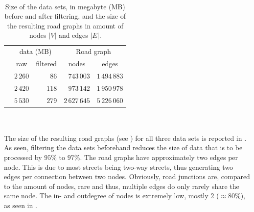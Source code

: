	\begin{table}[ht]
	 	\begin{center}
	 		\phantom{v}\quad\\
			\begin{tabular}{|l||r|r|r|r|}
				\hline
							&\multicolumn{2}{c|}{data (MB)}	&\multicolumn{2}{c|}{Road graph}\\
							&\multicolumn{1}{c|}{raw}	&\multicolumn{1}{c|}{filtered}	&\multicolumn{1}{c|}{nodes}
								&\multicolumn{1}{c|}{edges}\\\hline
				\freiburgR		&$2\,260$	&$86$		&$743\,003$		&$1\,494\,883$\\
				\stuttgartR		&$2\,420$	&$118$	&$973\,142$		&$1\,950\,978$\\
				\switzerlandR	&$5\,530$	&$279$	&$2\,627\,645$	&$5\,226\,060$\\\hline
			\end{tabular}
		\end{center}
		\caption{Size of the \osm data sets, in megabyte (MB) before and after filtering, and the size of the resulting road graphs
			in amount of nodes $|V|$ and edges $|E|$.}
		\label{osmSize}
	\end{table}\quad\\\\
	The size of the resulting road graphs (see ) for all three data sets is reported in .
	As seen, filtering the \osm data sets beforehand reduces the size of data that is to be processed by $95\%$ to $97\%$.
	The road graphs have approximately two edges per node. This is due to most streets being two-way streets, thus generating
	two edges per connection between two nodes. Obviously, road junctions are, compared to the amount of nodes, rare and thus,
	multiple edges do only rarely share the same node. The in- and outdegree of nodes is extremely low, mostly $2$ ($\approx 80\%$),
	as seen in .
